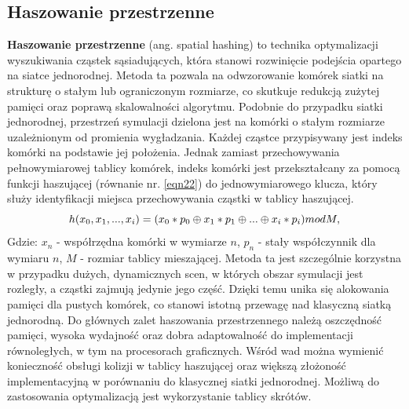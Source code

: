 \documentclass{article}
\begin{document}
\subsection{Haszowanie przestrzenne}
\textbf{Haszowanie przestrzenne} (ang. spatial hashing)\cite{spatial_hashing} to technika optymalizacji wyszukiwania cząstek sąsiadujących, która stanowi rozwinięcie podejścia opartego na siatce jednorodnej.
Metoda ta pozwala na odwzorowanie komórek siatki na strukturę o stałym lub ograniczonym rozmiarze, co skutkuje redukcją zużytej pamięci oraz poprawą skalowalności algorytmu.\newline\newline
\indent
Podobnie do przypadku siatki jednorodnej, przestrzeń symulacji dzielona jest na komórki o stałym rozmiarze uzależnionym od promienia wygładzania. 
Każdej cząstce przypisywany jest indeks komórki na podstawie jej położenia. 
Jednak zamiast przechowywania pełnowymiarowej tablicy komórek, indeks komórki jest przekształcany za pomocą funkcji haszującej (równanie nr. \ref{eqn22}) do jednowymiarowego klucza, 
który służy identyfikacji miejsca przechowywania cząstki w tablicy haszującej.\newline
\begin{equation}\label{eqn22}
h(x_0,x_1,...,x_i) = (x_0*p_0\oplus x_1*p_1 \oplus ... \oplus x_i*p_i)\space mod \space M,
\end{equation}
\indent
Gdzie:\newline
$x_n$ - współrzędna komórki w wymiarze $n$,\newline
$p_n$ - stały współczynnik dla wymiaru $n$,\newline
$M$ - rozmiar tablicy mieszającej.\newline\newline
Metoda ta jest szczególnie korzystna w przypadku dużych, dynamicznych scen, w których obszar symulacji jest rozległy, a cząstki zajmują jedynie jego część. 
Dzięki temu unika się alokowania pamięci dla pustych komórek, co stanowi istotną przewagę nad klasyczną siatką jednorodną.\newline
Do głównych zalet haszowania przestrzennego należą oszczędność pamięci, wysoka wydajność oraz dobra adaptowalność do implementacji równoległych, w tym na procesorach graficznych. 
Wśród wad można wymienić konieczność obsługi kolizji w tablicy haszującej oraz większą złożoność implementacyjną w porównaniu do klasycznej siatki jednorodnej.\newline\newline
\indent
Możliwą do zastosowania optymalizacją jest wykorzystanie tablicy skrótów. 
\end{document}
